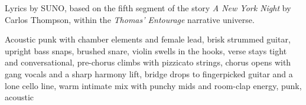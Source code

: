 
\begin{notes}
Lyrics by SUNO, based on the fifth segment of the story \emph{A New York Night} by Carlos Thompson, %
within the \emph{Thomas’ Entourage} narrative universe.
\end{notes}
\begin{style}
Acoustic punk with chamber elements and female lead, brisk strummed guitar, upright bass snaps, brushed snare, violin swells in the hooks, verse stays tight and conversational, pre-chorus climbs with pizzicato strings, chorus opens with gang vocals and a sharp harmony lift, bridge drops to fingerpicked guitar and a lone cello line, warm intimate mix with punchy mids and room-clap energy, punk, acoustic
\end{style}
